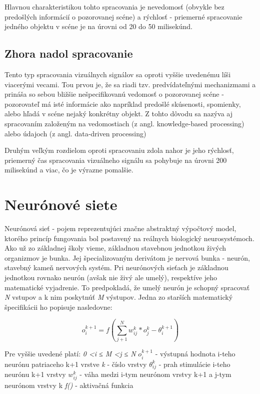 Hlavnou charakteristikou tohto spracovania je nevedomosť (obvykle bez predošlých informácií o pozorovanej scéne) a rýchlosť - priemerné spracovanie jedného objektu v scéne je na úrovni od 20 do 50 milisekúnd\cite{itti2001computational}.


\subsection{Zhora nadol spracovanie}
Tento typ spracovania vizuálnych signálov sa oproti vyššie uvedenému líši viacerými vecami. Tou prvou je, že sa riadi tzv. predvídateľnými mechanizmami a prináša so sebou bližšie nešpecifikovanú vedomosť o pozorovanej scéne - pozorovateľ má isté informácie ako napríklad predošlé skúsenosti, spomienky, alebo hľadá v scéne nejaký konkrétny objekt. Z tohto dôvodu sa nazýva aj spracovaním založeným na vedomostiach (z angl. knowledge-based processing\cite{goldstein2008blackwell}) alebo údajoch (z angl. data-driven processing\cite{gregory1974concepts})

Druhým veľkým rozdielom oproti spracovaniu zdola nahor je jeho rýchlosť, priemerný čas spracovania vizuálneho signálu sa pohybuje na úrovni 200 milisekúnd\cite{itti2001computational} a viac, čo je výrazne pomalšie.


\section{Neurónové siete}
\label{nn}

Neurónová sieť - pojem reprezentujúci značne abstraktný výpočtový model, ktorého princíp fungovania bol postavený na reálnych biologický neurosystémoch. Ako už zo základnej školy vieme, základnou stavebnou jednotkou živých organizmov je bunka. Jej špecializovaným derivátom je nervová bunka - neurón, stavebný kameň nervových systém. Pri neurónových sieťach je základnou jednotkou rovnako neurón (avšak nie živý ale umelý), respektíve jeho matematické vyjadrenie. To predpokladá, že umelý neurón je schopný spracovať \textit{N} vstupov a k nim poskytnúť \textit{M} výstupov. Jedna zo starších matematický špecifikácii ho popisuje nasledovne:

	\begin{equation}
		o_i ^{k+1} = f\left ( \sum_{j+1}^{N} w_{ij}^{k} * o_j^k - \theta_i^{k+1}  \right )
	\end{equation}
	
Pre vyššie uvedené platí: 
\newline
\textit{0 \textless i ≤ M
 \textless j ≤ N}
\newline
\(o_i^{k+1}\)  - výstupná hodnota i-teho neurónu patriaceho k+1 vrstve 
\newline
\textit{k} - číslo vrstvy
\newline
\(\theta_{ij}^{k}\) - prah stimulácie i-teho neurónu k+1 vrstvy
\newline
\(w_{ij}^{k}\) - váha medzi i-tym neurónom vrstvy k+1 a j-tym neurónom vrstvy k 
\newline 
\textit{f()} - aktivačná funkcia
\newline
	
